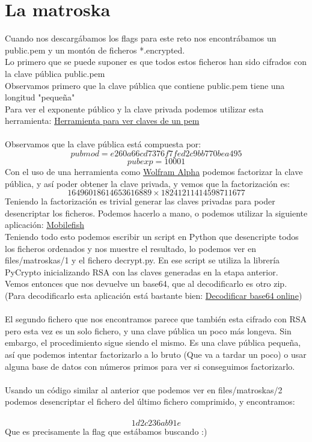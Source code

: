 \documentclass[11pt, spanish]{report}
\begin{document}
\section*{La matroska}
Cuando nos descargábamos los flags para este reto nos encontrábamos un public.pem y un montón de ficheros *.encrypted. \\
Lo primero que se puede suponer es que todos estos ficheros han sido cifrados con la clave pública public.pem \\
Observamos primero que la clave pública que contiene public.pem tiene una longitud "pequeña"\\
Para ver el exponente público y la clave privada podemos utilizar esta herramienta: \href{https://8gwifi.org/PemParserFunctions.jsp}{Herramienta para ver claves de un pem} \\ \\
Observamos que la clave pública está compuesta por:
$$pubmod=e260a66cd7376f7fed2c9bb770bea495$$
$$pubexp=10001$$
Con el uso de una herramienta como \href{https://www.wolframalpha.com/input/?i=300907363049052383020612454787728712853}{Wolfram Alpha} podemos factorizar la clave pública, y así poder obtener la clave privada, y vemos que la factorización es:
$$16496018614653616889 \times 18241211414598711677$$
Teniendo la factorización es trivial generar las claves privadas para poder desencriptar los ficheros. Podemos hacerlo a mano, o podemos utilizar la siguiente aplicación: \href{https://www.mobilefish.com/services/rsa_key_generation/rsa_key_generation.php}{Mobilefish} \\
Teniendo todo esto podemos escribir un script en Python que desencripte todos los ficheros ordenados y nos muestre el resultado, lo podemos ver en files/matroskas/1 y el fichero decrypt.py. En ese script se utiliza la librería PyCrypto inicializando RSA con las claves generadas en la etapa anterior. \\
Vemos entonces que nos devuelve un base64, que al decodificarlo es otro zip. (Para decodificarlo esta aplicación está bastante bien: \href{https://www.base64decode.org/}{Decodificar base64 online}) \\ \\
El segundo fichero que nos encontramos parece que también esta cifrado con RSA pero esta vez es un solo fichero, y una clave pública un poco más longeva. Sin embargo, el procedimiento sigue siendo el mismo. Es una clave pública pequeña, así que podemos intentar factorizarlo a lo bruto (Que va a tardar un poco) o usar alguna base de datos con números primos para ver si conseguimos factorizarlo. \\ \\
Usando un código similar al anterior que podemos ver en files/matroskas/2 podemos desencriptar el fichero del último fichero comprimido, y encontramos: \\ \\
$$1d2c236ab91e$$ Que es precisamente la flag que estábamos buscando :)
\end{document}
